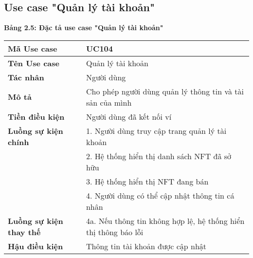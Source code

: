 \subsection{Use case "Quản lý tài khoản"}
\textbf{Bảng 2.5: Đặc tả use case "Quản lý tài khoản"}
\renewcommand{\arraystretch}{1.5}
\begin{tabular}{|l|p{10cm}|}
    \hline
    \rule{0pt}{3ex}\textbf{Mã Use case} & UC104 \\
    \hline
    \rule{0pt}{3ex}\textbf{Tên Use case} & Quản lý tài khoản \\
    \hline
    \rule{0pt}{3ex}\textbf{Tác nhân} & Người dùng \\
    \hline
    \rule{0pt}{3ex}\textbf{Mô tả} & Cho phép người dùng quản lý thông tin và tài sản của mình \\
    \hline
    \rule{0pt}{3ex}\textbf{Tiền điều kiện} & Người dùng đã kết nối ví \\
    \hline
    \rule{0pt}{3ex}\textbf{Luồng sự kiện chính} & 1. Người dùng truy cập trang quản lý tài khoản \\
    & 2. Hệ thống hiển thị danh sách NFT đã sở hữu \\
    & 3. Hệ thống hiển thị NFT đang bán \\
    & 4. Người dùng có thể cập nhật thông tin cá nhân \\
    \hline
    \rule{0pt}{3ex}\textbf{Luồng sự kiện thay thế} & 4a. Nếu thông tin không hợp lệ, hệ thống hiển thị thông báo lỗi \\
    \hline
    \rule{0pt}{3ex}\textbf{Hậu điều kiện} & Thông tin tài khoản được cập nhật \\
    \hline
\end{tabular}

